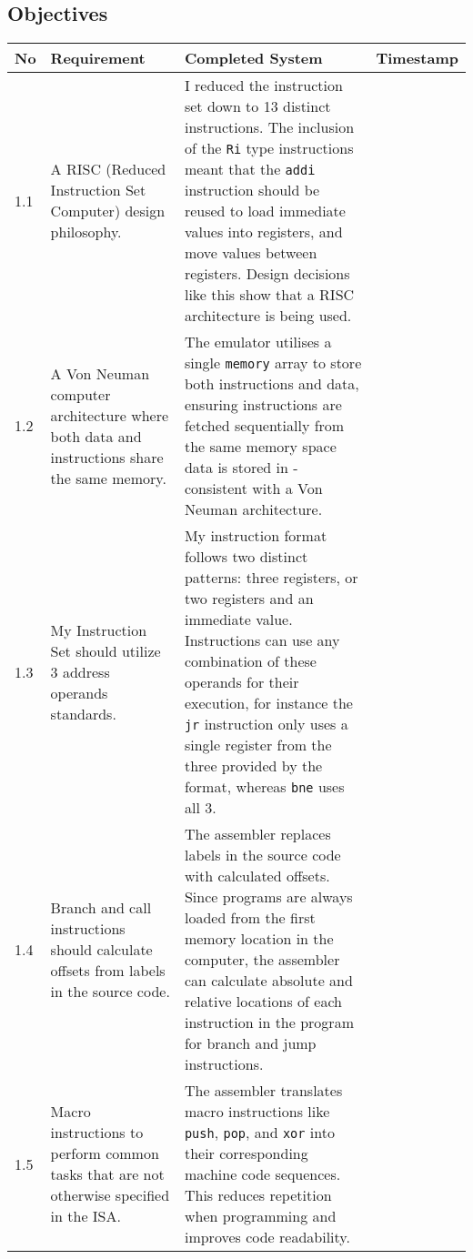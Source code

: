 \subsection{Objectives}

\begin{longtable}{|p{1cm}|p{5cm}|p{6cm}|p{2cm}|} 
    \hline
        No & Requirement & Completed System & Timestamp \\
    \hline
        1.1
        & 
        A RISC (Reduced Instruction Set Computer) design philosophy. 
        &
        I reduced the instruction set down to 13 distinct instructions. The inclusion of the \texttt{Ri} type instructions meant that the \texttt{addi} instruction should be reused to load immediate values into registers, and move values between registers. Design decisions like this show that a RISC architecture is being used. 
        & 
        \\
  \hline
        1.2 
        & 
        A Von Neuman computer architecture where both data and instructions share the same memory. 
        & 
        The emulator utilises a single \texttt{memory} array to store both instructions and data, ensuring instructions are fetched sequentially from the same memory space data is stored in - consistent with a Von Neuman architecture.
        & 
        \\
  \hline
        1.3 
        &  
        My Instruction Set should utilize 3 address operands standards.
        & 
        My instruction format follows two distinct patterns: three registers, or two registers and an immediate value. Instructions can use any combination of these operands for their execution, for instance the \texttt{jr} instruction only uses a single register from the three provided by the format, whereas \texttt{bne} uses all 3.  
        & 
        \\
  \hline
        1.4 
        & 
        Branch and call instructions should calculate offsets from labels in the source code. 
        & 
        The assembler replaces labels in the source code with calculated offsets. Since programs are always loaded from the first memory location in the computer, the assembler can calculate absolute and relative locations of each instruction in the program for branch and jump instructions.
        & 
        \\
  \hline
        1.5 
        & 
        Macro instructions to perform common tasks that are not otherwise specified in the ISA. 
        &
        The assembler translates macro instructions like \texttt{push}, \texttt{pop}, and \texttt{xor} into their corresponding machine code sequences. This reduces repetition when programming and improves code readability. 

\end{longtable}
